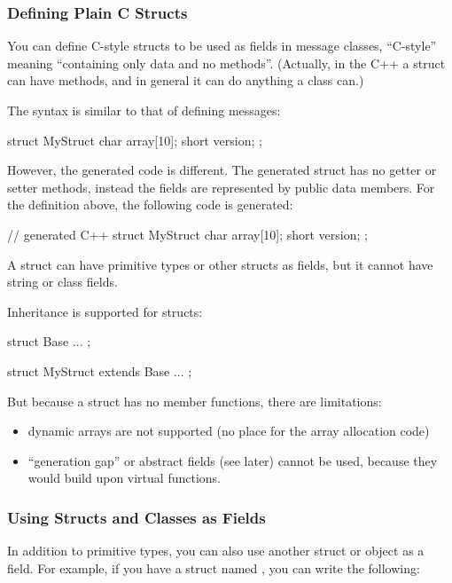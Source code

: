 \subsubsection{Defining Plain C Structs}

You can define C-style structs to be used as fields in message classes,
``C-style'' meaning ``containing only data and no methods''.
(Actually, in the C++ a struct can have methods,
and in general it can do anything a class can.)

The syntax is similar to that of defining messages:

\begin{msg}
struct MyStruct
{
    char array[10];
    short version;
};
\end{msg}

However, the generated code is different. The generated struct has
no getter or setter methods, instead the fields are represented
by public data members. For the definition above, the
following code is generated:

\begin{cpp}
// generated C++
struct MyStruct
{
    char array[10];
    short version;
};
\end{cpp}

A struct can have primitive types or other structs as fields, but it cannot
have string or class fields.

Inheritance is supported for structs:

\begin{msg}
struct Base
{
    ...
};

struct MyStruct extends Base
{
    ...
};
\end{msg}

But because a struct has no member functions, there are limitations:

\begin{itemize}
   \item dynamic arrays are not supported (no place for the array allocation code)
   \item ``generation gap'' or abstract fields (see later) cannot be used,
      because they would build upon virtual functions.
\end{itemize}


\subsubsection{Using Structs and Classes as Fields}

In addition to primitive types, you can also use another struct or object
as a field. For example, if you have a struct named ,
you can write the following:

